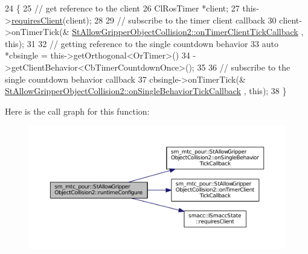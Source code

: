 \begin{DoxyCode}
24     \{
25         \textcolor{comment}{// get reference to the client}
26         ClRosTimer *client;
27         this->\hyperlink{classsmacc_1_1ISmaccState_a7f95c9f0a6ea2d6f18d1aec0519de4ac}{requiresClient}(client);
28 
29         \textcolor{comment}{// subscribe to the timer client callback}
30         client->onTimerTick(&
      \hyperlink{structsm__mtc__pour_1_1StAllowGripperObjectCollision2_a79a5df408d720ccb9a7d04824df0012d}{StAllowGripperObjectCollision2::onTimerClientTickCallback}
      , \textcolor{keyword}{this});
31 
32         \textcolor{comment}{// getting reference to the single countdown behavior}
33         \textcolor{keyword}{auto} *cbsingle = this->getOrthogonal<OrTimer>()
34                              ->getClientBehavior<CbTimerCountdownOnce>();
35 
36         \textcolor{comment}{// subscribe to the single countdown behavior callback}
37         cbsingle->onTimerTick(&
      \hyperlink{structsm__mtc__pour_1_1StAllowGripperObjectCollision2_abb0fa7e24bfe375ccc6a2f2093178fba}{StAllowGripperObjectCollision2::onSingleBehaviorTickCallback}
      , \textcolor{keyword}{this});
38     \}
\end{DoxyCode}


Here is the call graph for this function\+:
\nopagebreak
\begin{figure}[H]
\begin{center}
\leavevmode
\includegraphics[width=350pt]{structsm__mtc__pour_1_1StAllowGripperObjectCollision2_a36c13bc158273e48b4b387be634d73d5_cgraph}
\end{center}
\end{figure}


